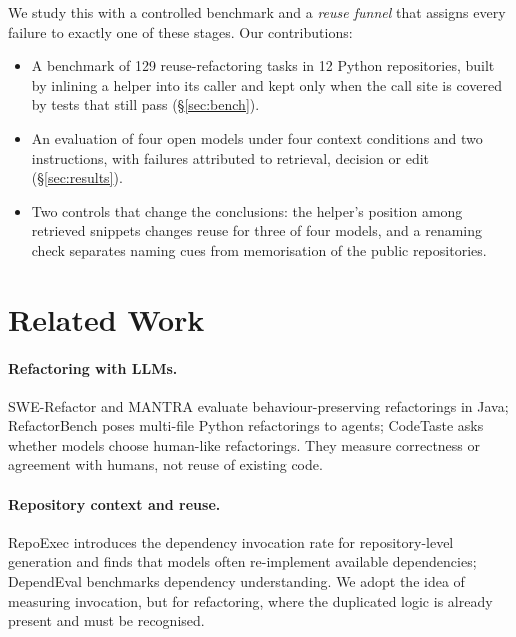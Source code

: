 \documentclass[11pt]{article}
\begin{document}
We study this with a controlled benchmark and a \emph{reuse funnel} that assigns every failure to exactly one
of these stages. Our contributions:
\begin{itemize}
  \setlength\itemsep{0pt}
  \item A benchmark of 129 reuse-refactoring tasks in 12 Python repositories, built by inlining a helper into its
        caller and kept only when the call site is covered by tests that still pass (\S\ref{sec:bench}).
  \item An evaluation of four open models under four context conditions and two instructions, with failures
        attributed to retrieval, decision or edit (\S\ref{sec:results}).
  \item Two controls that change the conclusions: the helper's position among retrieved snippets
        changes reuse for three of four models, and a renaming check separates naming cues from
        memorisation of the public repositories.
\end{itemize}

\section{Related Work}

\paragraph{Refactoring with LLMs.}
SWE-Refactor \citep{xu2026swerefactorrepositorylevelbenchmarkrealworld} and MANTRA
\citep{xu2025mantraenhancingautomatedmethodlevel} evaluate behaviour-preserving refactorings in Java;
RefactorBench \citep{gautam2025refactorbenchevaluatingstatefulreasoning} poses multi-file Python refactorings
to agents; CodeTaste \citep{thillen2026codetastellmsgeneratehumanlevel} asks whether models choose
human-like refactorings. They measure correctness or agreement with humans, not reuse of existing code.

\paragraph{Repository context and reuse.}
RepoExec \citep{hai-etal-2025-impacts} introduces the dependency invocation rate for repository-level
generation and finds that models often re-implement available dependencies; DependEval
\citep{du-etal-2025-dependeval} benchmarks dependency understanding. We adopt the idea of measuring
invocation, but for refactoring, where the duplicated logic is already present and must be recognised.
\end{document}
